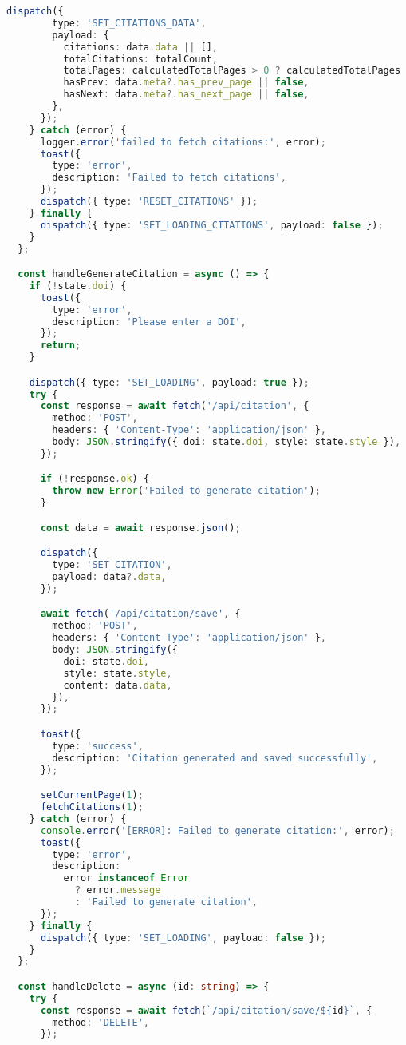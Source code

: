 \begin{lstlisting}[language=TypeScript, caption={Pembuatan Sitasi}, inputencoding=utf8]
      dispatch({
        type: 'SET_CITATIONS_DATA',
        payload: {
          citations: data.data || [],
          totalCitations: totalCount,
          totalPages: calculatedTotalPages > 0 ? calculatedTotalPages : 1,
          hasPrev: data.meta?.has_prev_page || false,
          hasNext: data.meta?.has_next_page || false,
        },
      });
    } catch (error) {
      logger.error('failed to fetch citations:', error);
      toast({
        type: 'error',
        description: 'Failed to fetch citations',
      });
      dispatch({ type: 'RESET_CITATIONS' });
    } finally {
      dispatch({ type: 'SET_LOADING_CITATIONS', payload: false });
    }
  };

  const handleGenerateCitation = async () => {
    if (!state.doi) {
      toast({
        type: 'error',
        description: 'Please enter a DOI',
      });
      return;
    }

    dispatch({ type: 'SET_LOADING', payload: true });
    try {
      const response = await fetch('/api/citation', {
        method: 'POST',
        headers: { 'Content-Type': 'application/json' },
        body: JSON.stringify({ doi: state.doi, style: state.style }),
      });

      if (!response.ok) {
        throw new Error('Failed to generate citation');
      }

      const data = await response.json();

      dispatch({
        type: 'SET_CITATION',
        payload: data?.data,
      });

      await fetch('/api/citation/save', {
        method: 'POST',
        headers: { 'Content-Type': 'application/json' },
        body: JSON.stringify({
          doi: state.doi,
          style: state.style,
          content: data.data,
        }),
      });

      toast({
        type: 'success',
        description: 'Citation generated and saved successfully',
      });

      setCurrentPage(1);
      fetchCitations(1);
    } catch (error) {
      console.error('[ERROR]: Failed to generate citation:', error);
      toast({
        type: 'error',
        description:
          error instanceof Error
            ? error.message
            : 'Failed to generate citation',
      });
    } finally {
      dispatch({ type: 'SET_LOADING', payload: false });
    }
  };

  const handleDelete = async (id: string) => {
    try {
      const response = await fetch(`/api/citation/save/${id}`, {
        method: 'DELETE',
      });


\end{lstlisting}

